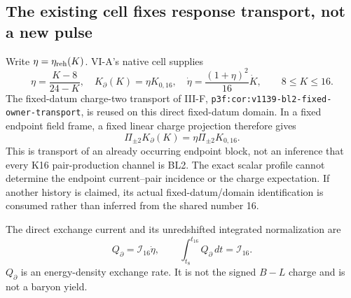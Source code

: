 \documentclass[12pt,a4paper]{article}
\begin{document}
\subsection{The existing cell fixes response transport, not a new pulse}
Write $\eta=\eta_{\rm reh}(K)$. VI-A's native cell supplies
\begin{equation}
 \eta=\frac{K-8}{24-K},\quad
 K_\partial(K)=\eta K_{0,16},\quad
 \dot\eta=\frac{(1+\eta)^2}{16}\dot K,
 \qquad 8\le K\le16.
 \label{p8:v2171:eq:cell}
\end{equation}
The fixed-datum charge-two transport of III-F,
\texttt{p3f:\allowbreak cor:\allowbreak v1139-\allowbreak bl2-\allowbreak fixed-\allowbreak owner-\allowbreak transport}, is reused on this direct
fixed-datum domain. In a fixed endpoint field frame, a fixed linear charge
projection therefore gives
\begin{equation}
 \Pi_{\pm2}K_\partial(K)=\eta\Pi_{\pm2}K_{0,16}.
 \label{p8:v2171:eq:chargeblock}
\end{equation}
This is transport of an already occurring endpoint block, not an inference
that every K16 pair-production channel is BL2. The exact scalar profile
cannot determine the endpoint current--pair incidence or the charge
expectation. If another history is claimed, its actual fixed-datum/domain
identification is consumed rather than inferred from the shared number 16.

The direct exchange current and its unredshifted integrated normalization are
\begin{equation}
 Q_\partial=\mathcal I_{16}\dot\eta,\qquad
 \int_{t_8}^{t_{16}}Q_\partial\,dt=\mathcal I_{16}.
 \label{p8:v2171:eq:energycurrent}
\end{equation}
$Q_\partial$ is an energy-density exchange rate. It is not the signed
$B-L$ charge and is not a baryon yield.
\end{document}
